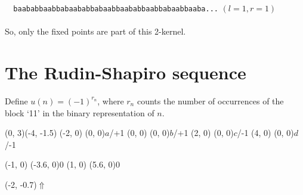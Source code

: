 \documentclass{article}
\begin{document}
\verb#  baababbaabbabaababbabaabbaababbaabbabaabbaaba...# $(l = 1, r = 1)$\\
\\
So, only the fixed points are part of this 2-kernel.

\section*{The Rudin-Shapiro sequence}
Define $u(n) = (-1)^{r_n}$, where $r_n$ counts the number of occurrences of
the block `11' in the binary representation of $n$.

\begin{graph}(0, 3)(-4, -1.5)
  (-2, 0) (0, 0){$a$/+1}
  (0, 0)  (0, 0){$b$/+1}
  (2, 0)  (0, 0){$c$/-1}
  (4, 0)  (0, 0){$d$/-1}

  (-1, 0) \freetext(-3.6, 0){0}
   
   
   
   
   
  (1, 0) \freetext(5.6, 0){0}
   

  \freetext(-2, -0.7){$\Uparrow$}
\end{graph}\\
\end{document}
